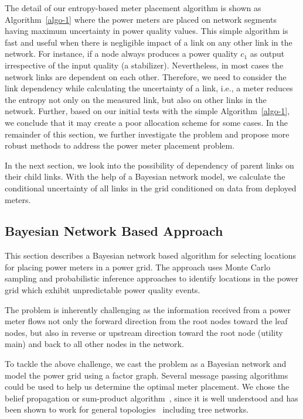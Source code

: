 The detail of our entropy-based meter placement algorithm is shown as Algorithm~\ref{algo-1} where the power meters are placed on network segments having maximum uncertainty in power quality values. This simple algorithm is fast and useful when there is negligible impact of a link on any other link in the network. For instance, if a node always produces a power quality $c_1$ as output irrespective of the input quality (a stabilizer). Nevertheless, in most cases the network links are dependent on each other. Therefore, we need to consider the link dependency while calculating the uncertainty of a link, i.e., a meter reduces the entropy not only on the measured link, but also on other links in the network. Further, based on our initial tests with the simple Algorithm~\ref{algo-1}, we conclude that it may create a poor allocation scheme for some cases. In the remainder of this section, we further investigate the problem and propose more robust methods to address the power meter placement problem.

In the next section, we look into the possibility of dependency of parent links on their child links. With the help of a Bayesian network model, we calculate the conditional uncertainty of all links in the grid conditioned on data from deployed meters. 

\subsection{Bayesian Network Based Approach}
\label{sec:predict} 
This section describes a Bayesian network based algorithm for selecting locations for placing power meters in a power grid. The approach uses Monte Carlo sampling and probabilistic inference approaches to identify locations in the power grid which exhibit unpredictable power quality events.

The problem is inherently challenging as the information received from a power meter flows not only the forward direction from the root nodes toward the leaf nodes, but also in reverse or upstream direction toward the root node (utility main) and back to all other nodes in the network. 

To tackle the above challenge, we cast the problem as a Bayesian network and model the power grid using a factor graph. Several message passing algorithms could be used to help us determine the optimal meter placement. We chose the belief propagation or sum-product algorithm~\cite{pearl1988probabilistic}, since it is well understood and has been shown to work for general topologies~\cite{yedidia2001generalized} including tree networks.

